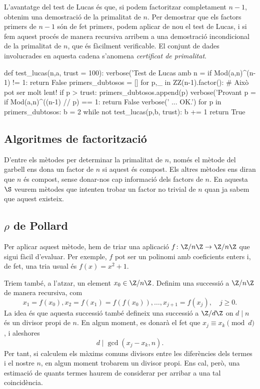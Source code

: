 L'avantatge del test de Lucas és que, si podem factoritzar completament $n-1$, obtenim una demostració de la primalitat de $n$. Per demostrar que els factors primers de $n-1$ són de fet primers, podem aplicar de nou el test de Lucas, i si fem aquest procés de manera recursiva arribem a una demostració incondicional de la primalitat de $n$, que és fàcilment verificable. El conjunt de dades involucrades en aquesta cadena s'anomena \emph{certificat de primalitat}.

\begin{python}
def test_lucas(n,a, trust = 100):
    verbose('Test de Lucas amb n = %
    if Mod(a,n)^(n-1) != 1:
        return False
    primers_dubtosos = []
    for p,_ in ZZ(n-1).factor(): # Això pot ser molt lent!
        if p > trust:
            primers_dubtosos.append(p)
        verbose('Provant p = %
        if Mod(a,n)^((n-1) // p) == 1:
            return False
        verbose(' ... OK.')
    for p in primers_dubtosos:
        b = 2
        while not test_lucas(p,b, trust):
            b += 1
    return True
\end{python}
\subsection{Algoritmes de factorització}
D'entre els mètodes per determinar la primalitat de $n$, només el mètode del garbell ens dona un factor de $n$ si aquest és compost. Els altres mètodes ens diran que $n$ és compost, sense donar-nos cap informació dels factors de $n$. En aquesta $\S$ veurem mètodes que intenten trobar un factor no trivial de $n$ quan ja sabem que aquest existeix.
 \subsection{\texorpdfstring{$\rho$}{Rho} de Pollard}
 Per aplicar aquest mètode, hem de triar una aplicació $f\colon \Z/n\Z\to \Z/n\Z$ que sigui fàcil d'evaluar. Per exemple, $f$ pot ser un polinomi amb coeficients enters i, de fet, una tria usual és $f(x)=x^2+1$.
 
 Triem també, a l'atzar, un element $x_0\in\Z/n\Z$. Definim una successió a $\Z/n\Z$ de manera recursiva, com
 \[
 x_1=f(x_0), x_2=f(x_1)=f(f(x_0)),\ldots, x_{j+1}=f(x_{j}),\quad j\geq 0.
 \]
 La idea és que aquesta successió també defineix una successió a $\Z/d\Z$ on $d\mid n$ és un divisor propi de $n$. En algun moment, es donarà el fet que $x_j\equiv x_k\pmod d$, i aleshores
 \[
 d\mid \gcd(x_j-x_k,n).
 \]
 Per tant, si calculem els màxims comuns divisors entre les diferències dels termes i el nostre $n$, en algun moment trobarem un divisor propi. Ens cal, però, una estimació de quants termes haurem de considerar per arribar a una tal coincidència.
 
